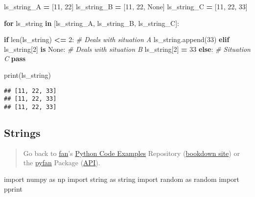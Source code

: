 \documentclass[
]{book}
\newenvironment{Shaded}{\begin{snugshade}}{\end{snugshade}}
\newcommand{\BuiltInTok}[1]{#1}
\newcommand{\CommentTok}[1]{\textcolor[rgb]{0.56,0.35,0.01}{\textit{#1}}}
\newcommand{\ControlFlowTok}[1]{\textcolor[rgb]{0.13,0.29,0.53}{\textbf{#1}}}
\newcommand{\DecValTok}[1]{\textcolor[rgb]{0.00,0.00,0.81}{#1}}
\newcommand{\ImportTok}[1]{#1}
\newcommand{\KeywordTok}[1]{\textcolor[rgb]{0.13,0.29,0.53}{\textbf{#1}}}
\newcommand{\NormalTok}[1]{#1}
\newcommand{\OperatorTok}[1]{\textcolor[rgb]{0.81,0.36,0.00}{\textbf{#1}}}
\newcommand{\VariableTok}[1]{\textcolor[rgb]{0.00,0.00,0.00}{#1}}
\begin{document}
\begin{Shaded}
\begin{Highlighting}[]

\NormalTok{ls\_string\_A }\OperatorTok{=}\NormalTok{ [}\DecValTok{11}\NormalTok{, }\DecValTok{22}\NormalTok{]}
\NormalTok{ls\_string\_B }\OperatorTok{=}\NormalTok{ [}\DecValTok{11}\NormalTok{, }\DecValTok{22}\NormalTok{, }\VariableTok{None}\NormalTok{]}
\NormalTok{ls\_string\_C }\OperatorTok{=}\NormalTok{ [}\DecValTok{11}\NormalTok{, }\DecValTok{22}\NormalTok{, }\DecValTok{33}\NormalTok{]}

\ControlFlowTok{for}\NormalTok{ ls\_string }\KeywordTok{in}\NormalTok{ [ls\_string\_A, ls\_string\_B, ls\_string\_C]:}

  \ControlFlowTok{if} \BuiltInTok{len}\NormalTok{(ls\_string) }\OperatorTok{\textless{}=} \DecValTok{2}\NormalTok{:}
    \CommentTok{\# Deals with situation A}
\NormalTok{    ls\_string.append(}\DecValTok{33}\NormalTok{)}
  \ControlFlowTok{elif}\NormalTok{ ls\_string[}\DecValTok{2}\NormalTok{] }\KeywordTok{is} \VariableTok{None}\NormalTok{:}
    \CommentTok{\# Deals with situation B}
\NormalTok{    ls\_string[}\DecValTok{2}\NormalTok{] }\OperatorTok{=} \DecValTok{33}
  \ControlFlowTok{else}\NormalTok{:}
    \CommentTok{\# Situation C}
    \ControlFlowTok{pass}

  \BuiltInTok{print}\NormalTok{(ls\_string)}
\end{Highlighting}
\end{Shaded}

\begin{verbatim}
## [11, 22, 33]
## [11, 22, 33]
## [11, 22, 33]
\end{verbatim}

\hypertarget{strings}{%
\subsection{Strings}\label{strings}}

\begin{quote}
Go back to \href{http://fanwangecon.github.io/}{fan}'s \href{https://fanwangecon.github.io/Py4Econ/}{Python Code Examples} Repository (\href{https://fanwangecon.github.io/Py4Econ/bookdown}{bookdown site}) or the \href{https://pyfan.readthedocs.io/en/latest/}{pyfan} Package (\href{https://pyfan.readthedocs.io/en/latest/reference.html}{API}).
\end{quote}

\begin{Shaded}
\begin{Highlighting}[]
\ImportTok{import}\NormalTok{ numpy }\ImportTok{as}\NormalTok{ np}
\ImportTok{import}\NormalTok{ string }\ImportTok{as}\NormalTok{ string}
\ImportTok{import}\NormalTok{ random }\ImportTok{as}\NormalTok{ random}
\ImportTok{import}\NormalTok{ pprint}
\end{Highlighting}
\end{Shaded}
\end{document}
